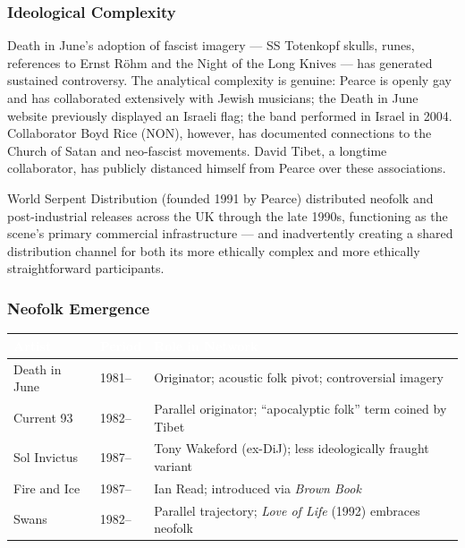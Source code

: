 \documentclass[11pt,letterpaper]{article}
\newcommand{\tableheader}[1]{\textbf{\sffamily\textcolor{white}{#1}}}
\begin{document}
\subsubsection{Ideological Complexity}

Death in June's adoption of fascist imagery — SS Totenkopf skulls, runes, references to
Ernst Röhm and the Night of the Long Knives — has generated sustained controversy. The
analytical complexity is genuine: Pearce is openly gay and has collaborated extensively
with Jewish musicians; the Death in June website previously displayed an Israeli flag; the
band performed in Israel in 2004. Collaborator Boyd Rice (NON), however, has documented
connections to the Church of Satan and neo-fascist movements. David Tibet, a longtime
collaborator, has publicly distanced himself from Pearce over these associations.

World Serpent Distribution (founded 1991 by Pearce) distributed neofolk and post-industrial
releases across the UK through the late 1990s, functioning as the scene's primary commercial
infrastructure — and inadvertently creating a shared distribution channel for both its
more ethically complex and more ethically straightforward participants.

\subsubsection{Neofolk Emergence}

\begin{center}
\begin{tabularx}{\textwidth}{L{3cm}L{3cm}X}
\toprule
{}
\tableheader{Artist} & \tableheader{Period} & \tableheader{Role in Network} \\
\midrule
Death in June & 1981-- & Originator; acoustic folk pivot; controversial imagery \\
Current 93 & 1982-- & Parallel originator; ``apocalyptic folk'' term coined by Tibet \\
Sol Invictus & 1987-- & Tony Wakeford (ex-DiJ); less ideologically fraught variant \\
Fire and Ice & 1987-- & Ian Read; introduced via \textit{Brown Book} \\
Swans & 1982-- & Parallel trajectory; \textit{Love of Life} (1992) embraces neofolk \\
\bottomrule
\end{tabularx}
\end{center}
\end{document}
